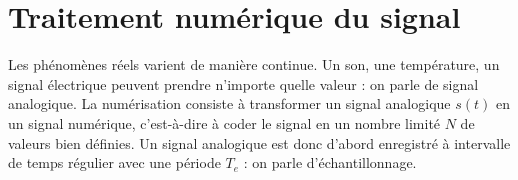 % 



\section{Traitement numérique du signal}
\label{sec:mod_freq}

Les phénomènes réels varient de manière continue. Un son, une température, un signal électrique peuvent prendre n'importe quelle valeur : on parle de signal analogique.
La numérisation consiste à transformer un signal analogique $s(t)$ en un signal numérique, c'est-à-dire à coder le signal en un nombre limité $N$ de valeurs bien définies. Un signal analogique est donc d'abord enregistré à intervalle de temps régulier avec une période $T_e$ : on parle d'échantillonnage.


